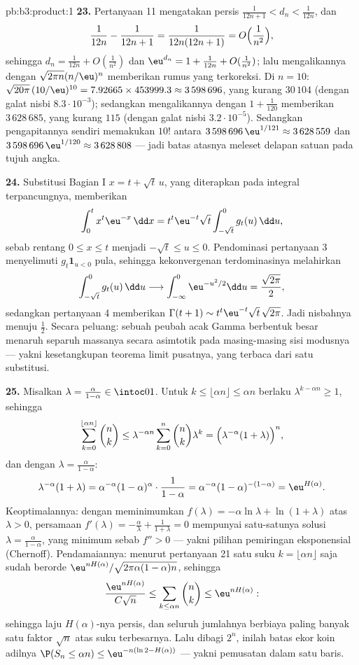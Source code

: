 \begin{solution}{pb:b3:product:1}
\textbf{23.} Pertanyaan 11 mengatakan persis $\frac1{12n+1} < d_n <
\frac1{12n}$, dan
\[
\frac1{12n} - \frac1{12n+1} = \frac1{12n(12n+1)} =
O\Bigl(\frac1{n^2}\Bigr),
\]
sehingga $d_n = \frac1{12n} + O(\frac1{n^2})$ dan $\eu^{d_n} = 1 +
\frac1{12n} + O(\frac1{n^2})$; lalu mengalikannya dengan
$\sqrt{2\pi n}(n/\eu)^n$ memberikan rumus yang terkoreksi. Di $n =
10$: $\sqrt{20\pi}\,(10/\eu)^{10} = 7.92665 \times 453999.3
\approx 3\,598\,696$, yang kurang $30\,104$ (dengan galat nisbi
$8.3\cdot10^{-3}$); sedangkan mengalikannya dengan $1 + \frac1{120}$ memberikan
$3\,628\,685$, yang kurang $115$ (dengan galat nisbi
$3.2\cdot10^{-5}$). Sedangkan pengapitannya sendiri memakukan $10!$ antara
$3\,598\,696\,\eu^{1/121} \approx 3\,628\,559$ dan
$3\,598\,696\,\eu^{1/120} \approx 3\,628\,808$ --- jadi batas
atasnya meleset delapan satuan pada tujuh angka.

\textbf{24.} Substitusi Bagian I $x = t + \sqrt t\,u$, yang
diterapkan pada integral terpancungnya, memberikan
\[
\int_0^{t} x^{t}\eu^{-x}\,\dd x
= t^{t}\eu^{-t}\sqrt t\int_{-\sqrt t}^{0} g_t(u)\,\dd u ,
\]
sebab rentang $0 \leq x \leq t$ menjadi $-\sqrt t \leq u \leq
0$. Pendominasi pertanyaan 3 menyelimuti $g_t\mathbf 1_{u < 0}$
pula, sehingga kekonvergenan terdominasinya melahirkan
\[
\int_{-\sqrt t}^{0}g_t(u)\,\dd u \longrightarrow
\int_{-\infty}^{0}\eu^{-u^2/2}\dd u = \frac{\sqrt{2\pi}}2 ,
\]
sedangkan pertanyaan 4 memberikan $\Gamma(t+1) \sim
t^t\eu^{-t}\sqrt t\,\sqrt{2\pi}$. Jadi nisbahnya menuju
$\frac12$. Secara peluang: sebuah peubah acak Gamma berbentuk
besar menaruh separuh massanya secara asimtotik pada masing-masing sisi
modusnya --- yakni kesetangkupan teorema limit pusatnya, yang terbaca
dari satu substitusi.

\textbf{25.} Misalkan $\lambda = \frac{\alpha}{1-\alpha} \in
\intoc01$. Untuk $k \leq \lfloor\alpha n\rfloor \leq \alpha n$
berlaku $\lambda^{k - \alpha n} \geq 1$, sehingga
\[
\sum_{k=0}^{\lfloor\alpha n\rfloor}\binom nk
\leq \lambda^{-\alpha n}\sum_{k=0}^{n}\binom nk\lambda^{k}
= \Bigl(\lambda^{-\alpha}(1 + \lambda)\Bigr)^{n},
\]
dan dengan $\lambda = \frac\alpha{1-\alpha}$:
\[
\lambda^{-\alpha}(1+\lambda)
= \alpha^{-\alpha}(1-\alpha)^{\alpha}\cdot\frac1{1-\alpha}
= \alpha^{-\alpha}(1-\alpha)^{-(1-\alpha)}
= \eu^{H(\alpha)} .
\]
Keoptimalannya: dengan meminimumkan $f(\lambda) = -\alpha\ln\lambda +
\ln(1+\lambda)$ atas $\lambda > 0$, persamaan $f'(\lambda)
= -\frac\alpha\lambda + \frac1{1+\lambda} = 0$ mempunyai satu-satunya
solusi $\lambda = \frac\alpha{1-\alpha}$, yang minimum sebab
$f'' > 0$ --- yakni pilihan pemiringan eksponensial (Chernoff).
Pendamaiannya: menurut pertanyaan 21 satu suku $k =
\lfloor\alpha n\rfloor$ saja sudah berorde
$\eu^{nH(\alpha)}/\sqrt{2\pi\alpha(1-\alpha)n}$, sehingga
\[
\frac{\eu^{nH(\alpha)}}{C\sqrt n} \leq
\sum_{k\leq\alpha n}\binom nk \leq \eu^{nH(\alpha)} :
\]
sehingga laju $H(\alpha)$-nya persis, dan seluruh jumlahnya berbiaya paling banyak
satu faktor $\sqrt n$ atas suku terbesarnya. Lalu dibagi $2^n$,
inilah batas ekor koin adilnya $\P(S_n \leq \alpha n) \leq
\eu^{-n(\ln2 - H(\alpha))}$ --- yakni pemusatan  dalam
satu baris.

\end{solution}
